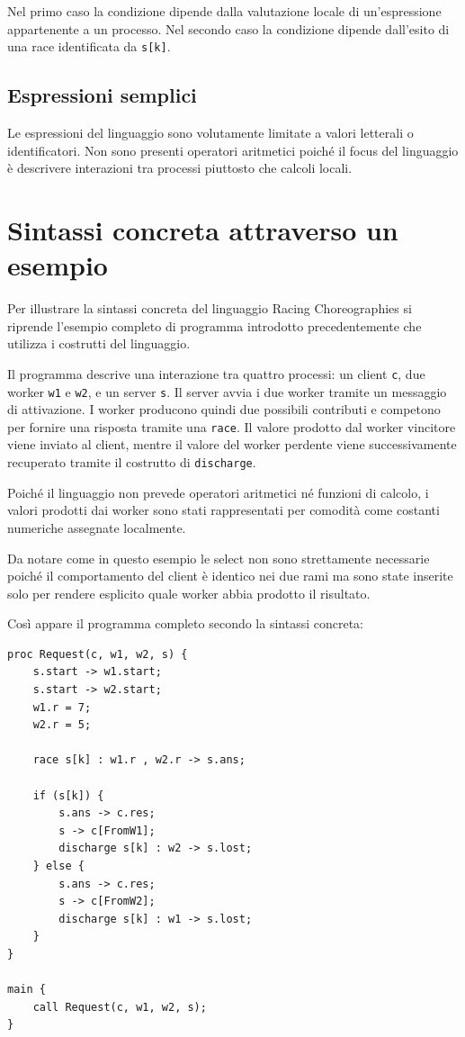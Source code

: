 Nel primo caso la condizione dipende dalla valutazione locale di un’espressione appartenente a un processo. Nel secondo caso la condizione dipende dall’esito di una race identificata da \texttt{s[k]}.

\subsection*{Espressioni semplici}

Le espressioni del linguaggio sono volutamente limitate a valori letterali o identificatori. Non sono presenti operatori aritmetici poiché il focus del linguaggio è descrivere interazioni tra processi piuttosto che calcoli locali.

\section{Sintassi concreta attraverso un esempio}

Per illustrare la sintassi concreta del linguaggio Racing Choreographies si riprende l'esempio completo di programma introdotto precedentemente che utilizza i costrutti del linguaggio.

Il programma descrive una interazione tra quattro processi: un client \texttt{c}, due worker \texttt{w1} e \texttt{w2}, e un server \texttt{s}. Il server avvia i due worker tramite un messaggio di attivazione. I worker producono quindi due possibili contributi e competono per fornire una risposta tramite una \texttt{race}. Il valore prodotto dal worker vincitore viene inviato al client, mentre il valore del worker perdente viene successivamente recuperato tramite il costrutto di \texttt{discharge}.

Poiché il linguaggio non prevede operatori aritmetici né funzioni di calcolo, i valori prodotti dai worker sono stati rappresentati per comodità come costanti numeriche assegnate localmente.

Da notare come in questo esempio le select non sono strettamente necessarie poiché il comportamento del client è identico nei due rami ma sono state inserite solo per rendere esplicito quale worker abbia prodotto il risultato.


Così appare il programma completo secondo la sintassi concreta:

\newpage

\begin{lstlisting}[caption={}, label={}, float, floatplacement=H]
proc Request(c, w1, w2, s) {
    s.start -> w1.start;
    s.start -> w2.start;
    w1.r = 7;
    w2.r = 5;

    race s[k] : w1.r , w2.r -> s.ans;

    if (s[k]) {
        s.ans -> c.res;
        s -> c[FromW1];
        discharge s[k] : w2 -> s.lost;
    } else {
        s.ans -> c.res;
        s -> c[FromW2];
        discharge s[k] : w1 -> s.lost;
    }
}

main {
    call Request(c, w1, w2, s);
}
\end{lstlisting}

